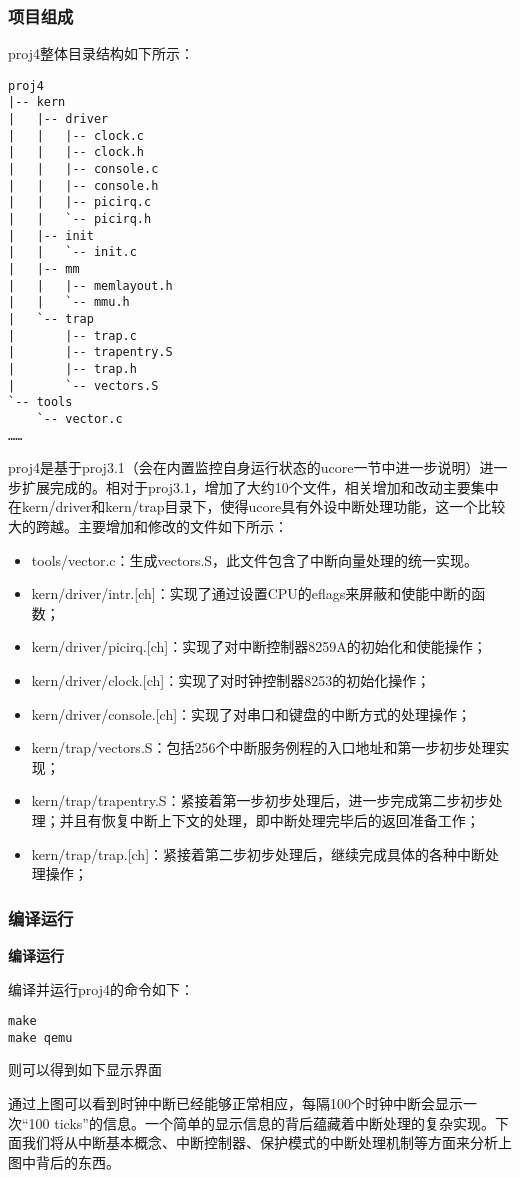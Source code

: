 \subsubsection{项目组成}\label{ux9879ux76eeux7ec4ux6210}

proj4整体目录结构如下所示：

\begin{lstlisting}
proj4
|-- kern
|   |-- driver
|   |   |-- clock.c
|   |   |-- clock.h
|   |   |-- console.c
|   |   |-- console.h
|   |   |-- picirq.c
|   |   `-- picirq.h
|   |-- init
|   |   `-- init.c
|   |-- mm
|   |   |-- memlayout.h
|   |   `-- mmu.h
|   `-- trap
|       |-- trap.c
|       |-- trapentry.S
|       |-- trap.h
|       `-- vectors.S
`-- tools
    `-- vector.c
…… 
\end{lstlisting}

proj4是基于proj3.1（会在内置监控自身运行状态的ucore一节中进一步说明）进一步扩展完成的。相对于proj3.1，增加了大约10个文件，相关增加和改动主要集中在kern/driver和kern/trap目录下，使得ucore具有外设中断处理功能，这一个比较大的跨越。主要增加和修改的文件如下所示：

\begin{itemize}
\tightlist
\item
  tools/vector.c：生成vectors.S，此文件包含了中断向量处理的统一实现。
\item
  kern/driver/intr.{[}ch{]}：实现了通过设置CPU的eflags来屏蔽和使能中断的函数；
\item
  kern/driver/picirq.{[}ch{]}：实现了对中断控制器8259A的初始化和使能操作；
\item
  kern/driver/clock.{[}ch{]}：实现了对时钟控制器8253的初始化操作；
\item
  kern/driver/console.{[}ch{]}：实现了对串口和键盘的中断方式的处理操作；
\item
  kern/trap/vectors.S：包括256个中断服务例程的入口地址和第一步初步处理实现；
\item
  kern/trap/trapentry.S：紧接着第一步初步处理后，进一步完成第二步初步处理；并且有恢复中断上下文的处理，即中断处理完毕后的返回准备工作；
\item
  kern/trap/trap.{[}ch{]}：紧接着第二步初步处理后，继续完成具体的各种中断处理操作；
\end{itemize}

\subsubsection{编译运行}\label{ux7f16ux8bd1ux8fd0ux884c}

\textbf{编译运行}

编译并运行proj4的命令如下：

\begin{lstlisting}
make
make qemu
\end{lstlisting}

则可以得到如下显示界面 

通过上图可以看到时钟中断已经能够正常相应，每隔100个时钟中断会显示一次``100
ticks''的信息。一个简单的显示信息的背后蕴藏着中断处理的复杂实现。下面我们将从中断基本概念、中断控制器、保护模式的中断处理机制等方面来分析上图中背后的东西。
